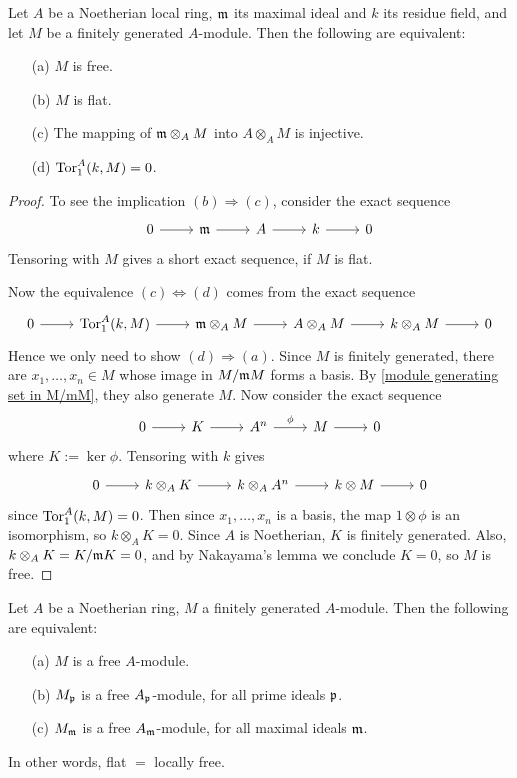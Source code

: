 \begin{exercise}\label{Noe local ring flat iff free}
Let $A$ be a Noetherian local ring, $\mathfrak{m}$ its maximal ideal and $k$ its residue field, and let $M$ be a finitely generated $A$-module. Then the following are equivalent:
\begin{itemize}
\item[(a)] $M$ is free.
\item[(b)] $M$ is flat.
\item[(c)] The mapping of $\mathfrak{m}\otimes_AM$ into $A\otimes_AM$ is injective.
\item[(d)] $\mathrm{Tor}^A_1(k,M)=0$.
\end{itemize}
\end{exercise}
\begin{proof}
To see the implication $(b)\Rightarrow(c)$, consider the exact sequence
\[\begin{tikzcd}
0\ar[r]&\m\ar[r]&A\ar[r]&k\ar[r]&0
\end{tikzcd}\]
Tensoring with $M$ gives a short exact sequence, if $M$ is flat.\par
Now the equivalence $(c)\Leftrightarrow(d)$ comes from the exact sequence
\[\begin{tikzcd}
0\ar[r]&\Tor^A_1(k,M)\ar[r]&\m\otimes_AM\ar[r]&A\otimes_AM\ar[r]&k\otimes_AM\ar[r]&0
\end{tikzcd}\]
Hence we only need to show $(d)\Rightarrow(a)$. Since $M$ is finitely generated, there are $x_1,\dots,x_n\in M$ whose image in $M/\mathfrak{m} M$ forms a basis. By \cref{module generating set in M/mM}, they also generate $M$. Now consider the exact sequence
\[\begin{tikzcd}
0\ar[r]&K\ar[r]&A^n\ar[r,"\phi"]&M\ar[r]&0
\end{tikzcd}\]
where $K:=\ker\phi$. Tensoring with $k$ gives
\[\begin{tikzcd}
0\ar[r]&k\otimes_AK\ar[r]&k\otimes_AA^n\ar[r]&k\otimes M\ar[r]&0
\end{tikzcd}\]
since $\mathrm{Tor}^A_1(k,M)=0$. Then since $x_1,\dots,x_n$ is a basis, the map $1\otimes\phi$ is an isomorphism, so $k\otimes_AK=0$. Since $A$ is Noetherian, $K$ is finitely generated. Also, $k\otimes_AK=K/\mathfrak{m} K=0$, and by Nakayama's lemma we conclude $K=0$, so $M$ is free.
\end{proof}
\begin{exercise}
Let $A$ be a Noetherian ring, $M$ a finitely generated $A$-module. Then the following are equivalent:
\begin{itemize}
\item[(a)] $M$ is a free $A$-module.
\item[(b)] $M_{\mathfrak{p}}$ is a free $A_{\mathfrak{p}}$-module, for all prime ideals $\mathfrak{p}$.
\item[(c)] $M_{\mathfrak{m}}$ is a free $A_{\mathfrak{m}}$-module, for all maximal ideals $\mathfrak{m}$.
\end{itemize}
In other words, flat $=$ locally free.
\end{exercise}

